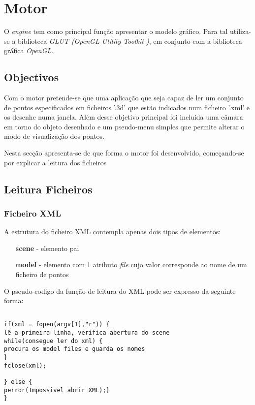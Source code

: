 \chapter{Motor}
\label{cap:p2}

O \textit{engine} tem como principal função apresentar o modelo gráfico. Para
tal utiliza-se a biblioteca \textit{GLUT (OpenGL Utility Toolkit )}, em conjunto com
a biblioteca gráfica \textit{OpenGL}.


\section{Objectivos}

Com o motor pretende-se que uma aplicação que seja capaz de ler um conjunto de pontos especificados em ficheiros '.3d' que estão indicados num ficheiro '.xml' e os desenhe numa janela. Além desse objetivo principal foi incluída uma câmara em torno do objeto desenhado e um pseudo-menu simples que permite alterar o modo de visualização dos pontos.

Nesta secção apresenta-se de que forma o motor foi desenvolvido, começando-se por explicar a leitura dos ficheiros

\section{Leitura Ficheiros}

\subsection{Ficheiro XML}

A estrutura do ficheiro XML contempla apenas dois tipos de elementos:

\begin{itemize}
	\item[\textbf{scene}] - elemento pai
	\item[\textbf{model}] - elemento com 1 atributo \textit{file} cujo valor corresponde ao nome de um ficheiro de pontos
\end{itemize}



O pseudo-codigo da função de leitura do XML pode ser expresso da seguinte forma:

\begin{Verbatim}

if(xml = fopen(argv[1],"r")) {
lê a primeira linha, verifica abertura do scene
while(consegue ler do xml) {
procura os model files e guarda os nomes 
}
fclose(xml);

} else {
perror(Impossivel abrir XML);}
}
\end{Verbatim}


